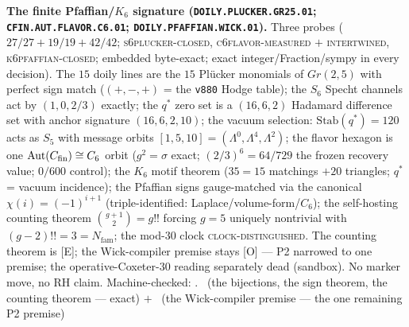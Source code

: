 \documentclass[11pt,a4paper]{article}
\newcommand{\Nfam}{N_{\mathrm{fam}}}
\theoremstyle{definition}
\begin{document}
\par\smallskip\noindent\textbf{The finite Pfaffian/$K_6$
signature (\texttt{DOILY.PLUCKER.\allowbreak GR25.01};
\texttt{CFIN.AUT.\allowbreak FLAVOR.C6.01};
\texttt{DOILY.PFAFFIAN.\allowbreak WICK.01}).}
Three probes ($27/27 + 19/19 + 42/42$;
\textsc{s6plucker-closed}, \textsc{c6flavor-measured} $+$
\textsc{intertwined}, \textsc{k6pfaffian-closed}; embedded
byte-exact; exact integer/Fraction/sympy in every decision).
The $15$ doily lines are the $15$ Pl\"ucker monomials of
$Gr(2,5)$ with perfect sign match ($(+,-,+)$ = the
\texttt{v880} Hodge table); the $S_6$ Specht channels act by
$(1, 0, 2/3)$ exactly; the $q^{*}$ zero set is a $(16, 6, 2)$
Hadamard difference set with anchor signature $(16, 6, 2, 10)$;
the vacuum selection: $\mathrm{Stab}(q^{*}) = 120$ acts as
$S_5$ with message orbits $[1, 5, 10] = (\Lambda^0, \Lambda^4,
\Lambda^2)$; the flavor hexagon is one $\mathrm{Aut}(C_{\rm
fin}) \cong C_6$ orbit ($g^2 = \sigma$ exact; $(2/3)^6 =
64/729$ the frozen recovery value; $0/600$ control); the $K_6$
motif theorem ($35 = 15$ matchings $+ 20$ triangles; $q^{*}$ =
vacuum incidence); the Pfaffian signs gauge-matched via the
canonical $\chi(i) = (-1)^{i+1}$ (triple-identified:
Laplace/volume-form/$C_6$); the self-hosting counting theorem
$\binom{g+1}{2} = g!!$ forcing $g = 5$ uniquely nontrivial with
$(g-2)!! = 3 = \Nfam$; the mod-$30$ clock
\textsc{clock-distinguished}.  The counting theorem is [E]; the
Wick-compiler premise stays [O] --- P2 narrowed to one premise;
the operative-Coxeter-$30$ reading separately dead (sandbox).
No marker move, no RH claim.
Machine-checked: .
\mE\ (the bijections, the sign theorem, the counting theorem
--- exact) $+$ \mO\ (the Wick-compiler premise --- the one
remaining P2 premise)
\par\smallskip
\end{document}
